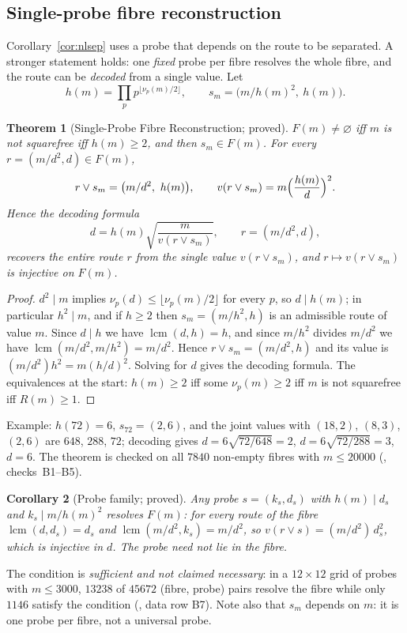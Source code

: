 \documentclass[11pt,a4paper]{article}
\newcommand{\lcm}{\operatorname{lcm}}
\newcommand{\vj}{\mathbin{\vee}}
\theoremstyle{plain}
\newtheorem{theorem}{Theorem}[section]
\newtheorem{corollary}[theorem]{Corollary}
\theoremstyle{definition}
\begin{document}
\subsection{Single-probe fibre reconstruction}\label{sec:nlprobe}
Corollary~\ref{cor:nlsep} uses a probe that depends on the route to be separated. A stronger statement holds: one \emph{fixed} probe per fibre resolves the whole fibre, and the route can be \emph{decoded} from a single value. Let
\[ h(m)=\prod_p p^{\lfloor\nu_p(m)/2\rfloor},\qquad s_m=\bigl(m/h(m)^2,\ h(m)\bigr). \]
\begin{theorem}[Single-Probe Fibre Reconstruction; proved]\label{thm:nlsingle}
$F(m)\ne\varnothing$ iff $m$ is not squarefree iff $h(m)\ge2$, and then $s_m\in F(m)$. For every $r=(m/d^2,d)\in F(m)$,
\[ r\vj s_m=\bigl(m/d^2,\ h(m)\bigr),\qquad v(r\vj s_m)=m\Bigl(\frac{h(m)}{d}\Bigr)^{2}. \]
Hence the \emph{decoding formula}
\[ d=h(m)\sqrt{\frac{m}{v(r\vj s_m)}},\qquad r=(m/d^2,d), \]
recovers the entire route $r$ from the single value $v(r\vj s_m)$, and $r\mapsto v(r\vj s_m)$ is injective on $F(m)$.
\end{theorem}
\begin{proof}
$d^2\mid m$ implies $\nu_p(d)\le\lfloor\nu_p(m)/2\rfloor$ for every $p$, so $d\mid h(m)$; in particular $h^2\mid m$, and if $h\ge2$ then $s_m=(m/h^2,h)$ is an admissible route of value $m$. Since $d\mid h$ we have $\lcm(d,h)=h$, and since $m/h^2$ divides $m/d^2$ we have $\lcm(m/d^2,m/h^2)=m/d^2$. Hence $r\vj s_m=(m/d^2,h)$ and its value is $(m/d^2)h^2=m(h/d)^2$. Solving for $d$ gives the decoding formula. The equivalences at the start: $h(m)\ge2$ iff some $\nu_p(m)\ge2$ iff $m$ is not squarefree iff $R(m)\ge1$.
\end{proof}
\noindent Example: $h(72)=6$, $s_{72}=(2,6)$, and the joint values with $(18,2)$, $(8,3)$, $(2,6)$ are $648$, $288$, $72$; decoding gives $d=6\sqrt{72/648}=2$, $d=6\sqrt{72/288}=3$, $d=6$. The theorem is checked on all $7840$ non-empty fibres with $m\le20000$ (, checks~B1--B5).

\begin{corollary}[Probe family; proved]\label{cor:nlfamily}
Any probe $s=(k_s,d_s)$ with $h(m)\mid d_s$ and $k_s\mid m/h(m)^2$ resolves $F(m)$: for every route of the fibre $\lcm(d,d_s)=d_s$ and $\lcm(m/d^2,k_s)=m/d^2$, so $v(r\vj s)=(m/d^2)\,d_s^2$, which is injective in $d$. The probe need not lie in the fibre.
\end{corollary}
\noindent The condition is \emph{sufficient and not claimed necessary}: in a $12\times12$ grid of probes with $m\le3000$, $13238$ of $45672$ (fibre, probe) pairs resolve the fibre while only $1146$ satisfy the condition (, data row B7). Note also that $s_m$ depends on $m$: it is one probe per fibre, not a universal probe.
\end{document}
